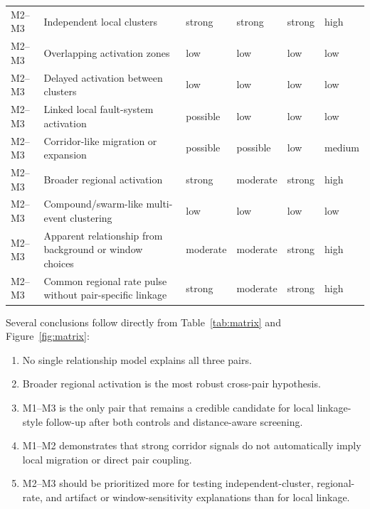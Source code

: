 \documentclass[11pt]{article}
\begin{document}
\begin{landscape}
\begin{table}[H]
\begin{tabularx}{\linewidth}{l l Y Y Y l}
\midrule
M2--M3 & Independent local clusters & strong & strong & strong & high \\
M2--M3 & Overlapping activation zones & low & low & low & low \\
M2--M3 & Delayed activation between clusters & low & low & low & low \\
M2--M3 & Linked local fault-system activation & possible & low & low & low \\
M2--M3 & Corridor-like migration or expansion & possible & possible & low & medium \\
M2--M3 & Broader regional activation & strong & moderate & strong & high \\
M2--M3 & Compound/swarm-like multi-event clustering & low & low & low & low \\
M2--M3 & Apparent relationship from background or window choices & moderate & moderate & strong & high \\
M2--M3 & Common regional rate pulse without pair-specific linkage & strong & moderate & strong & high \\
\bottomrule
\end{tabularx}
\end{table}
\end{landscape}

Several conclusions follow directly from Table~\ref{tab:matrix} and Figure~\ref{fig:matrix}:
\begin{enumerate}
    \item No single relationship model explains all three pairs.
    \item Broader regional activation is the most robust cross-pair hypothesis.
    \item M1--M3 is the only pair that remains a credible candidate for local linkage-style follow-up after both controls and distance-aware screening.
    \item M1--M2 demonstrates that strong corridor signals do not automatically imply local migration or direct pair coupling.
    \item M2--M3 should be prioritized more for testing independent-cluster, regional-rate, and artifact or window-sensitivity explanations than for local linkage.
\end{enumerate}
\end{document}
